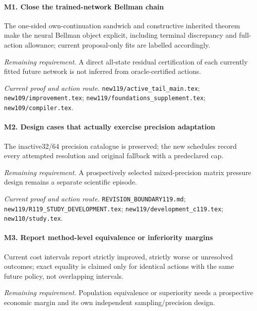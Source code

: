 \paragraph{M1. Close the trained-network Bellman chain}

The one-sided own-continuation sandwich and constructive inherited theorem make the neural Bellman object explicit, including terminal discrepancy and full-action allowance; current proposal-only fits are labelled accordingly.

\par\emph{Remaining requirement.} A direct all-state residual certification of each currently fitted future network is not inferred from oracle-certified actions.

\par\emph{Current proof and action route.} \nolinkurl{new119/active_tail_main.tex}; \nolinkurl{new109/improvement.tex}; \nolinkurl{new119/foundations_supplement.tex}; \nolinkurl{new109/compiler.tex}.

\paragraph{M2. Design cases that actually exercise precision adaptation}

The inactive32/64 precision catalogue is preserved; the new schedules record every attempted resolution and original fallback with a predeclared cap.

\par\emph{Remaining requirement.} A prospectively selected mixed-precision matrix pressure design remains a separate scientific episode.

\par\emph{Current proof and action route.} \nolinkurl{REVISION_BOUNDARY119.md}; \nolinkurl{new119/R119_STUDY_DEVELOPMENT.tex}; \nolinkurl{new119/development_c119.tex}; \nolinkurl{new110/study.tex}.

\paragraph{M3. Report method-level equivalence or inferiority margins}

Current cost intervals report strictly improved, strictly worse or unresolved outcomes; exact equality is claimed only for identical actions with the same future policy, not overlapping intervals.

\par\emph{Remaining requirement.} Population equivalence or superiority needs a prospective economic margin and its own independent sampling/\allowbreak{}precision design.

